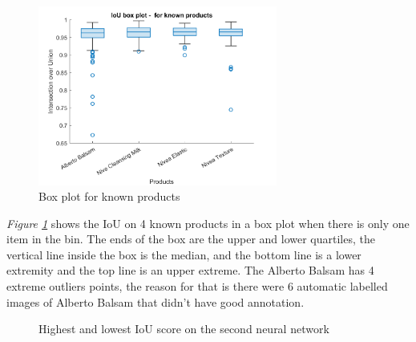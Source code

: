 \begin{figure}[h]
    \centering
    \includegraphics[width=0.7\textwidth]{graphics/results/v2boxplotForKnownProducts.png}
    \caption{Box plot for known products}
    \label{fig:v2boxknownproducts}
\end{figure}
\textit{Figure \ref{fig:v2boxknownproducts}} shows the IoU on 4 known products in a box plot when there is only one item in the bin. The ends of the box are the upper and lower quartiles,  the vertical line inside the box is the median, and the bottom line is a lower extremity and the top line is an upper extreme. The Alberto Balsam has 4 extreme outliers points, the reason for that is there were 6 automatic labelled images of Alberto Balsam that didn’t have good annotation. 

\begin{figure}[h]
    \centering
    \hspace{0.5cm}
    \caption{Highest and lowest IoU score on the second neural network}
    \label{figure: v2bestworst}
\end{figure}

